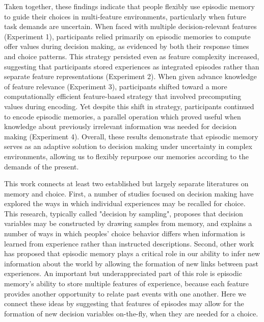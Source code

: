 \documentclass[10pt,letterpaper]{article}
\begin{document}
Taken together, these findings indicate that people flexibly use episodic memory to guide their choices in multi-feature environments, particularly when future task demands are uncertain. When faced with multiple decision-relevant features (Experiment 1), participants relied primarily on episodic memories to compute offer values during decision making, as evidenced by both their response times and choice patterns. This strategy persisted even as feature complexity increased, suggesting that participants stored experiences as integrated episodes rather than separate feature representations (Experiment 2). When given advance knowledge of feature relevance (Experiment 3), participants shifted toward a more computationally efficient feature-based strategy that involved precomputing values during encoding. Yet despite this shift in strategy, participants continued to encode episodic memories, a parallel operation which proved useful when knowledge about previously irrelevant information was needed for decision making (Experiment 4). Overall, these results demonstrate that episodic memory serves as an adaptive solution to decision making under uncertainty in complex environments, allowing us to flexibly repurpose our memories according to the demands of the present.

This work connects at least two established but largely separate literatures on memory and choice. First, a number of studies focused on decision making have explored the ways in which individual experiences may be recalled for choice\cite{STEWART20061, bieleLearningRiskAttitude2009,plonskyRelianceSmallSamples2015, shadlenDecisionMakingSequential2016, wangMixingMemoryDesire2022}. This research, typically called "decision by sampling", proposes that decision variables may be constructed by drawing samples from memory, and explains a number of ways in which peoples' choice behavior differs when information is learned from experience rather than instructed descriptions\cite{hertwigDescriptionExperienceGap2009}. Second, other work has proposed that episodic memory plays a critical role in our ability to infer new information about the world by allowing the formation of new links between past experiences\cite{schlichtingHippocampusMemoryIntegration2017,whittingtonTolmanEichenbaumMachineUnifying2020,bidermanWhatAreMemories2020}. An important but underappreciated part of this role is episodic memory's ability to store multiple features of experience, because each feature provides another opportunity to relate past events with one another. Here we connect these ideas by suggesting that features of episodes may allow for the formation of new decision variables on-the-fly, when they are needed for a choice.
\end{document}

